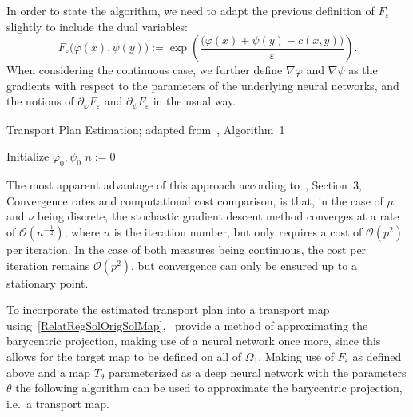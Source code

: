 In order to state the algorithm, we need to adapt the previous definition of $F_\varepsilon$ slightly to include the dual variables:
\[ F_\varepsilon\big( \varphi(x), \psi(y) \big) := \exp\left( \frac{\big( \varphi(x) + \psi(y) - c(x, y) \big)}{\varepsilon} \right). \]
When considering the continuous case, we further define $\nabla \varphi$ and $\nabla \psi$ as the gradients with respect to the parameters of the underlying neural networks, and the notions of $\partial_\varphi F_\varepsilon$ and $\partial_\psi F_\varepsilon$ in the usual way.

\begin{algorithm}\label{OTPlanEstAlg}
	\caption{Transport Plan Estimation; adapted from~\cite{Seg2018}, Algorithm~1}
	Initialize $\varphi_0, \psi_0$\;
	$n := 0$\;
\end{algorithm}

The most apparent advantage of this approach according to~\cite{Seg2018}, Section~3, Convergence rates and computational cost comparison, is that, in the case of $\mu$ and $\nu$ being discrete, the stochastic gradient descent method converges at a rate of $\mathcal{O}\left( n^{-\frac{1}{2}} \right)$, where $n$ is the iteration number, but only requires a cost of $\mathcal{O}(p^2)$ per iteration. In the case of both measures being continuous, the cost per iteration remains $\mathcal{O}(p^2)$, but convergence can only be ensured up to a stationary point.

To incorporate the estimated transport plan into a transport map using\ \ref{RelatRegSolOrigSolMap},~\cite{Seg2018} provide a method of approximating the barycentric projection, making use of a neural network once more, since this allows for the target map to be defined on all of $\Omega_1$. Making use of $F_\varepsilon$ as defined above and a map $T_\theta$ parameterized as a deep neural network with the parameters $\theta$ the following algorithm can be used to approximate the barycentric projection, i.e.\ a transport map.

